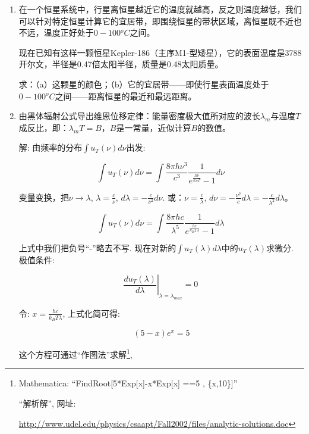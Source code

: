 \begin{enumerate}
\item 

在一个恒星系统中，行星离恒星越近它的温度就越高，反之则温度越低，我们可以针对特定恒星计算它的宜居带，即围绕恒星的带状区域，离恒星既不近也不远，温度正好处于$0-100 {}^o C$之间。

现在已知有这样一颗恒星Kepler-186（主序M1-型矮星），它的表面温度是3788开尔文，半径是0.47倍太阳半径，质量是0.48太阳质量。

求：（a）这颗星的颜色；（b）它的宜居带——即使行星表面温度处于$0-100 {}^o C$之间——距离恒星的最近和最远距离。


\item

由黑体辐射公式导出维恩位移定律：能量密度极大值所对应的波长$\lambda_m$与温度$T$成反比，即：$\lambda_m T = B$，$B$是一常量，近似计算$B$的数值。

解: 由频率的分布$\int u_T(\nu) d\nu$出发:

\begin{equation}
\int u_T(\nu)d\nu =\int  \frac{8\pi h
\nu^3}{c^3}\frac{1}{e^{\frac{h\nu}{k_B T}} -1} d \nu~
\end{equation}

变量变换，把$\nu \to \lambda$, $\lambda = \frac{c}{\nu}$, $d \lambda = - \frac{c}{\nu^2} d \nu$. 或：$\nu = \frac{c}{\lambda}$, $d\nu = - \frac{\nu^2}{c} d\lambda=-\frac{c}{\lambda^2}d\lambda$。

\begin{equation}
\int u_T(\nu) d \nu = \int \frac{8\pi
hc}{\lambda^5}\frac{1}{e^{\frac{hc}{k_B T\lambda}}-1} d\lambda~
\end{equation}

上式中我们把负号“-”略去不写. 现在对新的$\int u_T(\lambda)
d\lambda$中的$u_T(\lambda)$求微分. 极值条件:

\begin{equation}
\left. {\frac{d u_T(\lambda)}{d\lambda}} \right|_{\lambda =
\lambda_{max}} = 0~
\end{equation}

令: $x = \frac{hc}{k_B T \lambda}$, 上式化简可得:

\begin{equation}
(5-x)e^x =5
\end{equation}

这个方程可通过``作图法''求解\footnote{Mathematica:
``FindRoot[5*Exp[x]-x*Exp[x] ==5 , \{x,10\}]''

``解析解'', 网址:

\url{http://www.udel.edu/physics/csaapt/Fall2002/files/analytic-solutions.doc}},


\end{enumerate}
